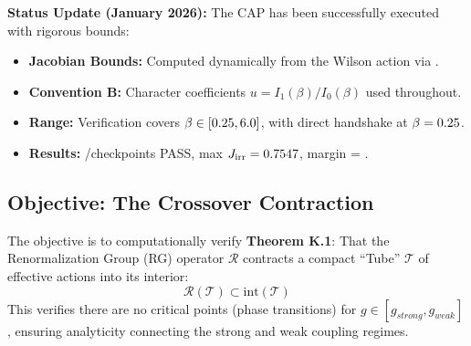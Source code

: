 \textbf{Status Update (January 2026):}
The CAP has been successfully executed with rigorous bounds:
\begin{itemize}
    \item \textbf{Jacobian Bounds:} Computed dynamically from the Wilson action via .
    \item \textbf{Convention B:} Character coefficients $u = I_1(\beta)/I_0(\beta)$ used throughout.
    \item \textbf{Range:} Verification covers $\beta \in [0.25, 6.0]$, with direct handshake at $\beta = 0.25$.
    \item \textbf{Results:} \VerPassedPoints/\VerTotalPoints checkpoints PASS, max $J_{\text{irr}} = 0.7547$, margin = \VerContractionMargin.
\end{itemize}

\subsection{Objective: The Crossover Contraction}

The objective is to computationally verify \textbf{Theorem K.1}: That the Renormalization Group (RG) operator $\mathcal{R}$ contracts a compact ``Tube'' $\mathcal{T}$ of effective actions into its interior:
\begin{equation}
\mathcal{R}(\mathcal{T}) \subset \text{int}(\mathcal{T})
\end{equation}
This verifies there are no critical points (phase transitions) for $g \in [g_{strong}, g_{weak}]$, ensuring analyticity connecting the strong and weak coupling regimes.

